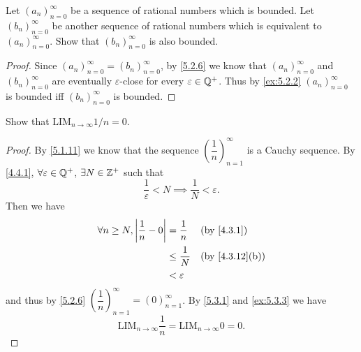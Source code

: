 \begin{ex}\label{ex:5.3.4}
  Let \((a_n)_{n = 0}^{\infty}\) be a sequence of rational numbers which is bounded.
  Let \((b_n)_{n = 0}^{\infty}\) be another sequence of rational numbers which is equivalent to \((a_n)_{n = 0}^{\infty}\).
  Show that \((b_n)_{n = 0}^{\infty}\) is also bounded.
\end{ex}

\begin{proof}
  Since \((a_n)_{n = 0}^{\infty} = (b_n)_{n = 0}^{\infty}\), by \cref{5.2.6} we know that \((a_n)_{n = 0}^{\infty}\) and \((b_n)_{n = 0}^{\infty}\) are eventually \(\varepsilon\)-close for every \(\varepsilon \in \mathbb{Q}^+\).
  Thus by \cref{ex:5.2.2} \((a_n)_{n = 0}^{\infty}\) is bounded iff \((b_n)_{n = 0}^{\infty}\) is bounded.
\end{proof}

\begin{ex}\label{ex:5.3.5}
  Show that \(\text{LIM}_{n \to \infty} 1 / n = 0\).
\end{ex}

\begin{proof}
  By \cref{5.1.11} we know that the sequence \((\dfrac{1}{n})_{n = 1}^{\infty}\) is a Cauchy sequence.
  By \cref{4.4.1}, \(\forall \varepsilon \in \mathbb{Q}^+\), \(\exists N \in \mathbb{Z}^+\) such that
  \[
    \dfrac{1}{\varepsilon} < N \implies \dfrac{1}{N} < \varepsilon.
  \]
  Then we have
  \begin{align*}
    \forall n \geq N, \abs{\dfrac{1}{n} - 0} & = \dfrac{1}{n}    &  & \by{4.3.1}     \\
                                             & \leq \dfrac{1}{N} &  & \by{4.3.12}[b] \\
                                             & < \varepsilon
  \end{align*}
  and thus by \cref{5.2.6} \((\dfrac{1}{n})_{n = 1}^\infty = (0)_{n = 1}^\infty\).
  By \cref{5.3.1} and \cref{ex:5.3.3} we have
  \[
    \text{LIM}_{n \to \infty} \dfrac{1}{n} = \text{LIM}_{n \to \infty} 0 = 0.
  \]
\end{proof}

